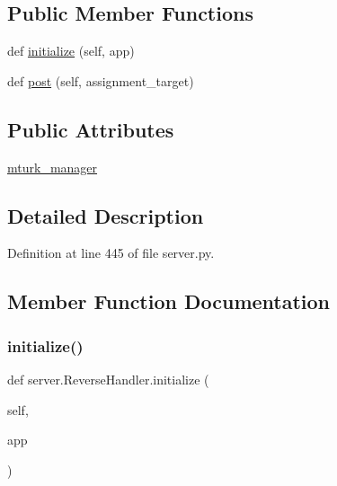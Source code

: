 \subsection*{Public Member Functions}
\begin{DoxyCompactItemize}
\item 
def \hyperlink{classserver_1_1ReverseHandler_a541ba207c60a3f754c7d295e6eca3abc}{initialize} (self, app)
\item 
def \hyperlink{classserver_1_1ReverseHandler_a3a51f6fb8e9da913acf8bb9719bebbe2}{post} (self, assignment\+\_\+target)
\end{DoxyCompactItemize}
\subsection*{Public Attributes}
\begin{DoxyCompactItemize}
\item 
\hyperlink{classserver_1_1ReverseHandler_a69830af3298059fb4e9a27e3d1398437}{mturk\+\_\+manager}
\end{DoxyCompactItemize}


\subsection{Detailed Description}


Definition at line 445 of file server.\+py.



\subsection{Member Function Documentation}
\mbox{\label{classserver_1_1ReverseHandler_a541ba207c60a3f754c7d295e6eca3abc}} 
\subsubsection{\texorpdfstring{initialize()}{initialize()}}
{\footnotesize\ttfamily def server.\+Reverse\+Handler.\+initialize (\begin{DoxyParamCaption}\item[{}]{self,  }\item[{}]{app }\end{DoxyParamCaption})}



